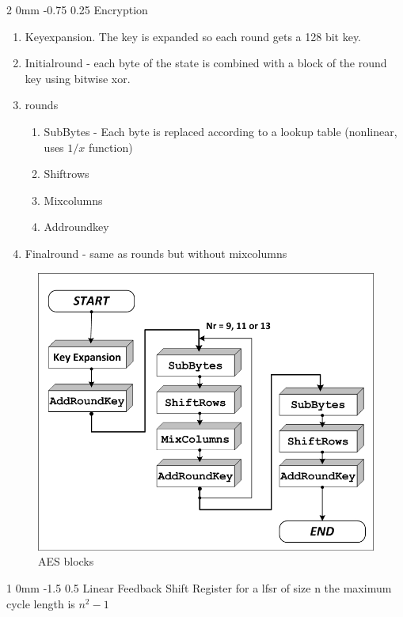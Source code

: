 \documentclass[a4paper,11pt]{article}
\makeatletter
\renewcommand{\section}{\@startsection
   {section}%
   {1}%
   {0mm}%
   {-1.5\baselineskip}%
   {0.5\baselineskip}%
   {\sffamily\bfseries\upshape\normalsize}}%
\renewcommand{\subsection}{\@startsection
   {subsection}%
   {2}%
   {0mm}%
   {-0.75\baselineskip}%
   {0.25\baselineskip}%
   {\rmfamily\normalfont\slshape\normalsize}}%
\makeatother
\begin{document}
\subsection{Encryption}
\begin{enumerate}
\item Keyexpansion. The key is expanded so each round gets a 128 bit key.
\item Initialround - each byte of the state is combined with a block of the round key using bitwise xor.
\item rounds 
\begin{enumerate}
\item SubBytes - Each byte is replaced according to a lookup table (nonlinear, uses $1/x$ function)
\item Shiftrows
\item Mixcolumns
\item Addroundkey
\end{enumerate}
\item Finalround - same as rounds but without mixcolumns
\end{enumerate}
\begin{figure}[H]
  \centering
  \includegraphics[scale=0.4]{AES.jpg}
  \caption{AES blocks}
\end{figure}

\section{ Linear Feedback Shift Register}
for a lfsr of size n the maximum cycle length is $n^2-1$
\end{document}
